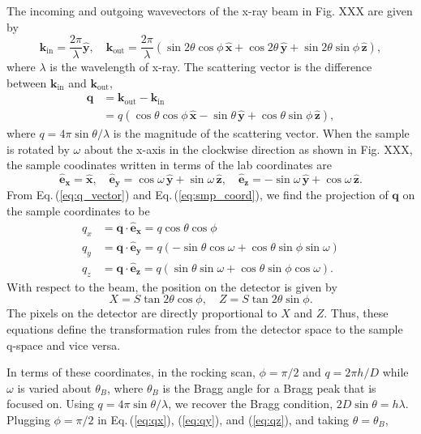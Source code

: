 \documentclass[12pt,letterpaper]{article}
\newcommand{\Eq}[1]{Eq.\,(\ref{#1})}%
\newcommand{\xhat}{\mathbf{\hat{x}}}
\newcommand{\yhat}{\mathbf{\hat{y}}}
\newcommand{\zhat}{\mathbf{\hat{z}}}
\newcommand{\kin}{\mathbf{k}_{\mathrm{in}}}
\newcommand{\kout}{\mathbf{k}_{\mathrm{out}}}
\begin{document}
The incoming and outgoing wavevectors of the x-ray beam in Fig. XXX 
are given by
\begin{equation}
  \kin = \frac{2\pi}{\lambda} \yhat, \quad
  \kout = 
    \frac{2\pi}{\lambda} \left( 
      \sin 2\theta \cos\phi \, \xhat
      + \cos 2\theta \, \yhat
      + \sin 2\theta \sin\phi \, \zhat 
    \right),
  \label{eq:kinkout}
\end{equation}
where $\lambda$ is the wavelength of x-ray. The scattering vector is
the difference between $\kin$ and $\kout$,
\begin{align}
  \mathbf{q} &= \kout - \kin \nonumber \\
             &= q \left( 
                  \cos\theta\cos\phi \, \xhat - \sin\theta \, \yhat
                  + \cos\theta\sin\phi \, \zhat
                \right),
  \label{eq:q_vector}
\end{align}
where $q=4\pi\sin\theta/\lambda$ is the magnitude of the scattering vector. 
When the sample is rotated by $\omega$ about the x-axis in the clockwise 
direction as shown in Fig. XXX, the sample coodinates written in terms of 
the lab coordinates are  
\begin{equation}
  \mathbf{\hat{e}_x} = \xhat, \quad
  \mathbf{\hat{e}_y} = \cos\omega\,\yhat + \sin\omega\,\zhat, \quad
  \mathbf{\hat{e}_z} = -\sin\omega\,\yhat + \cos\omega\,\zhat.
  \label{eq:smp_coord}
\end{equation}
From \Eq{eq:q_vector} and \Eq{eq:smp_coord}, we find the projection of $\mathbf{q}$ on the sample coordinates to be
\begin{align}
  q_x &= \mathbf{q}\cdot\mathbf{\hat{e}_x} 
       = q\cos\theta\cos\phi 
       \label{eq:qx} \\
  q_y &= \mathbf{q}\cdot\mathbf{\hat{e}_y} 
       = q\left(-\sin\theta\cos\omega + \cos\theta\sin\phi\sin\omega\right) 
       \label{eq:qy} \\
  q_z &= \mathbf{q}\cdot\mathbf{\hat{e}_z} 
       = q\left(\sin\theta\sin\omega + \cos\theta\sin\phi\cos\omega\right).
       \label{eq:qz}
\end{align}
With respect to the beam, the position on the detector is given by
\begin{equation}
  X = S \tan 2\theta \cos\phi, \quad Z = S \tan 2\theta \sin\phi.
\end{equation} 
The pixels on the detector are directly proportional to $X$ and $Z$. Thus,
these equations define the transformation rules from the detector space
to the sample q-space and vice versa.

In terms of these coordinates, in the rocking scan, $\phi=\pi/2$ and $q=2\pi h/D$
while $\omega$ is varied about $\theta_B$, where $\theta_B$ is the Bragg
angle for a Bragg peak that is focused on. Using $q=4\pi\sin\theta/\lambda$, 
we recover the Bragg condition, $2D\sin\theta=h\lambda$. Plugging $\phi=\pi/2$
in Eq.\,(\ref{eq:qx}), (\ref{eq:qy}), and (\ref{eq:qz}), and taking 
$\theta=\theta_B$, 
\end{document}

